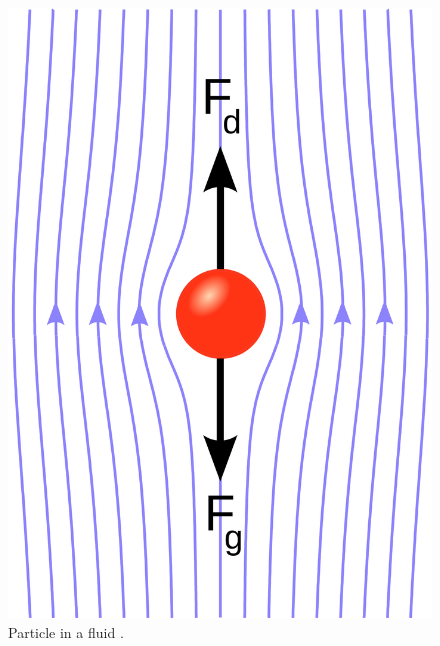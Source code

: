 \begin{figure}[!htb]
\centering
\includegraphics[width=.30\columnwidth]{images/131stokessphere}
\caption[Particle in a fluid]{Particle in a fluid \cite{Refworks:37}.}
\label{fig:131stokessphere}
\end{figure}